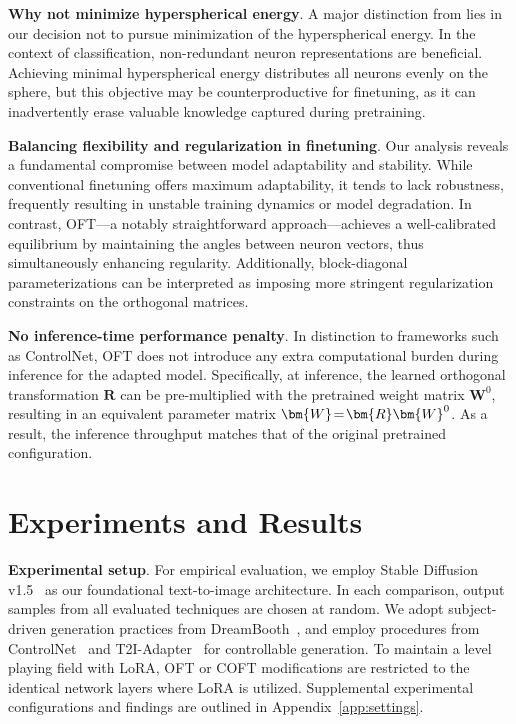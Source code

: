 {\textbf{Why not minimize hyperspherical energy}. A major distinction from \cite{liu2021orthogonal} lies in our decision not to pursue minimization of the hyperspherical energy. In the context of classification, non-redundant neuron representations are beneficial. Achieving minimal hyperspherical energy distributes all neurons evenly on the sphere, but this objective may be counterproductive for finetuning, as it can inadvertently erase valuable knowledge captured during pretraining.

\textbf{Balancing flexibility and regularization in finetuning}. Our analysis reveals a fundamental compromise between model adaptability and stability. While conventional finetuning offers maximum adaptability, it tends to lack robustness, frequently resulting in unstable training dynamics or model degradation. In contrast, OFT—a notably straightforward approach—achieves a well-calibrated equilibrium by maintaining the angles between neuron vectors, thus simultaneously enhancing regularity. Additionally, block-diagonal parameterizations can be interpreted as imposing more stringent regularization constraints on the orthogonal matrices.

\textbf{No inference-time performance penalty}. In distinction to frameworks such as ControlNet, OFT does not introduce any extra computational burden during inference for the adapted model. Specifically, at inference, the learned orthogonal transformation $\bm{R}$ can be pre-multiplied with the pretrained weight matrix $\bm{W}^0$, resulting in an equivalent parameter matrix $\thickmuskip=2mu \medmuskip=2mu \bm{W}=\bm{R}\bm{W}^0$. As a result, the inference throughput matches that of the original pretrained configuration.

\section{Experiments and Results}

\textbf{Experimental setup}. For empirical evaluation, we employ Stable Diffusion v1.5~\cite{rombach2022high} as our foundational text-to-image architecture. In each comparison, output samples from all evaluated techniques are chosen at random. We adopt subject-driven generation practices from DreamBooth~\cite{ruiz2023dreambooth}, and employ procedures from ControlNet~\cite{zhang2023adding} and T2I-Adapter~\cite{mou2023t2i} for controllable generation. To maintain a level playing field with LoRA, OFT or COFT modifications are restricted to the identical network layers where LoRA is utilized. Supplemental experimental configurations and findings are outlined in Appendix~\ref{app:settings}.

}

